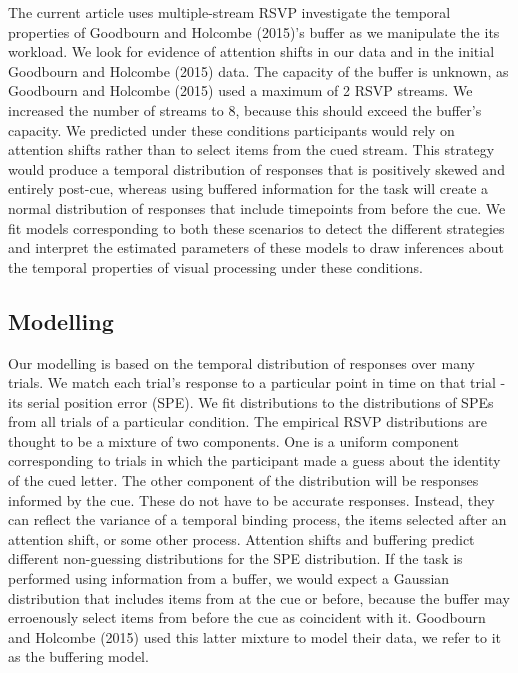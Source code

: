 \documentclass[,man,floatsintext]{apa6}
\theoremstyle{definition}
\theoremstyle{definition}
\theoremstyle{definition}
\theoremstyle{remark}
\begin{document}
The current article uses multiple-stream RSVP investigate the temporal
properties of Goodbourn and Holcombe (2015)'s buffer as we manipulate
the its workload. We look for evidence of attention shifts in our data
and in the initial Goodbourn and Holcombe (2015) data. The capacity of
the buffer is unknown, as Goodbourn and Holcombe (2015) used a maximum
of 2 RSVP streams. We increased the number of streams to 8, because this
should exceed the buffer's capacity. We predicted under these conditions
participants would rely on attention shifts rather than to select items
from the cued stream. This strategy would produce a temporal
distribution of responses that is positively skewed and entirely
post-cue, whereas using buffered information for the task will create a
normal distribution of responses that include timepoints from before the
cue. We fit models corresponding to both these scenarios to detect the
different strategies and interpret the estimated parameters of these
models to draw inferences about the temporal properties of visual
processing under these conditions.

\subsection{Modelling}\label{modelling}

Our modelling is based on the temporal distribution of responses over
many trials. We match each trial's response to a particular point in
time on that trial - its serial position error (SPE). We fit
distributions to the distributions of SPEs from all trials of a
particular condition. The empirical RSVP distributions are thought to be
a mixture of two components. One is a uniform component corresponding to
trials in which the participant made a guess about the identity of the
cued letter. The other component of the distribution will be responses
informed by the cue. These do not have to be accurate responses.
Instead, they can reflect the variance of a temporal binding process,
the items selected after an attention shift, or some other process.
Attention shifts and buffering predict different non-guessing
distributions for the SPE distribution. If the task is performed using
information from a buffer, we would expect a Gaussian distribution that
includes items from at the cue or before, because the buffer may
erroenously select items from before the cue as coincident with it.
Goodbourn and Holcombe (2015) used this latter mixture to model their
data, we refer to it as the buffering model.
\end{document}
